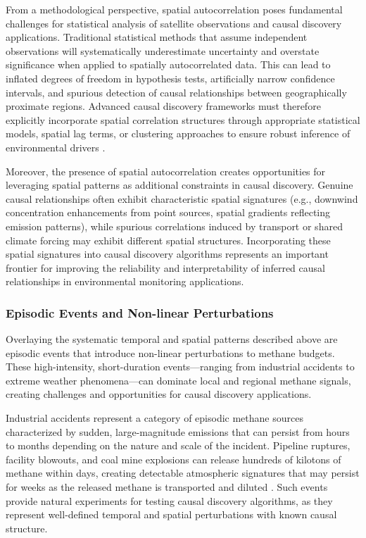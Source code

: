 From a methodological perspective, spatial autocorrelation poses fundamental challenges for statistical analysis of satellite observations and causal discovery applications. Traditional statistical methods that assume independent observations will systematically underestimate uncertainty and overstate significance when applied to spatially autocorrelated data. This can lead to inflated degrees of freedom in hypothesis tests, artificially narrow confidence intervals, and spurious detection of causal relationships between geographically proximate regions. Advanced causal discovery frameworks must therefore explicitly incorporate spatial correlation structures through appropriate statistical models, spatial lag terms, or clustering approaches to ensure robust inference of environmental drivers \cite{Runge2019}.

Moreover, the presence of spatial autocorrelation creates opportunities for leveraging spatial patterns as additional constraints in causal discovery. Genuine causal relationships often exhibit characteristic spatial signatures (e.g., downwind concentration enhancements from point sources, spatial gradients reflecting emission patterns), while spurious correlations induced by transport or shared climate forcing may exhibit different spatial structures. Incorporating these spatial signatures into causal discovery algorithms represents an important frontier for improving the reliability and interpretability of inferred causal relationships in environmental monitoring applications.

\subsubsection{Episodic Events and Non-linear Perturbations}

Overlaying the systematic temporal and spatial patterns described above are episodic events that introduce non-linear perturbations to methane budgets. These high-intensity, short-duration events—ranging from industrial accidents to extreme weather phenomena—can dominate local and regional methane signals, creating challenges and opportunities for causal discovery applications.

Industrial accidents represent a category of episodic methane sources characterized by sudden, large-magnitude emissions that can persist from hours to months depending on the nature and scale of the incident. Pipeline ruptures, facility blowouts, and coal mine explosions can release hundreds of kilotons of methane within days, creating detectable atmospheric signatures that may persist for weeks as the released methane is transported and diluted \cite{Lauvaux2022}. Such events provide natural experiments for testing causal discovery algorithms, as they represent well-defined temporal and spatial perturbations with known causal structure.

